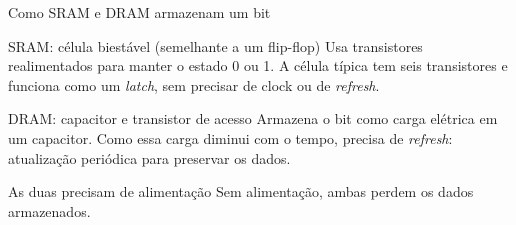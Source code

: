 \begin{frame}[t]{Como SRAM e DRAM armazenam um bit}
  \begin{block}{SRAM: célula biestável (semelhante a um flip-flop)}
    Usa transistores realimentados para manter o estado 0 ou 1.
    A célula típica tem seis transistores e funciona como um
    \textit{latch}, sem precisar de clock ou de \textit{refresh}.
  \end{block}

  \begin{block}{DRAM: capacitor e transistor de acesso}
    Armazena o bit como carga elétrica em um capacitor.
    Como essa carga diminui com o tempo, precisa de
    \textit{refresh}: atualização periódica para preservar os dados.
  \end{block}

  \begin{alertblock}{As duas precisam de alimentação}
    Sem alimentação, ambas perdem os dados armazenados.
  \end{alertblock}
\end{frame}
